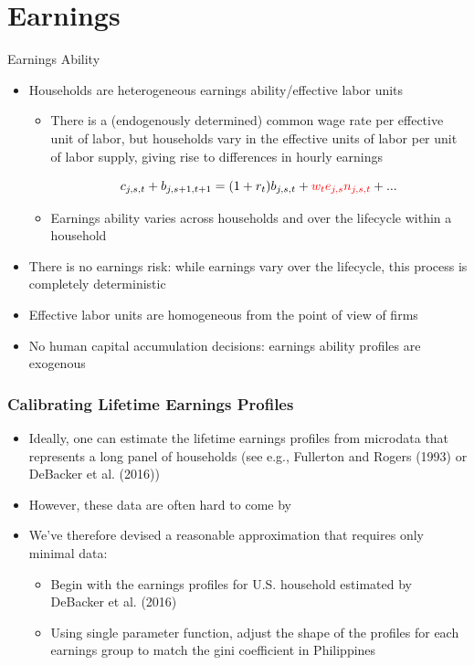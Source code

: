 \documentclass{beamer}
\begin{document}
\section{Earnings}
 \begin{frame}{Earnings Ability}
  \begin{itemize}
      \item Households are heterogeneous earnings ability/effective labor units
          \begin{itemize}
              \item There is a (endogenously determined) common wage rate per effective unit of labor, but households vary in the effective units of labor per unit of labor supply, giving rise to differences in hourly earnings

  \begin{equation*}
    c_{j,s,t} + b_{j,s+1,t+1} = (1 + r_{t})b_{j,s,t} + \textcolor{red}{w_t e_{j,s} n_{j,s,t}} + ...
  \end{equation*}

              \item Earnings ability varies across households and over the lifecycle within a household
          \end{itemize}
      \item There is no earnings risk: while earnings vary over the lifecycle, this process is completely deterministic
      \item Effective labor units are homogeneous from the point of view of firms
      \item No human capital accumulation decisions: earnings ability profiles are exogenous
  \end{itemize}
 \end{frame}

  \begin{frame}
\frametitle{Calibrating Lifetime Earnings Profiles}
  \begin{itemize}
      \item Ideally, one can estimate the lifetime earnings profiles from microdata that represents a long panel of households (see e.g., Fullerton and Rogers (1993) or DeBacker et al. (2016))
      \item However, these data are often hard to come by
      \item We've therefore devised a reasonable approximation that requires only minimal data:
          \begin{itemize}
              \item Begin with the earnings profiles for U.S. household estimated by DeBacker et al. (2016)
              \item Using single parameter function, adjust the shape of the profiles for each earnings group to match the gini coefficient in Philippines
          \end{itemize}
  \end{itemize}
\end{frame}
\end{document}
